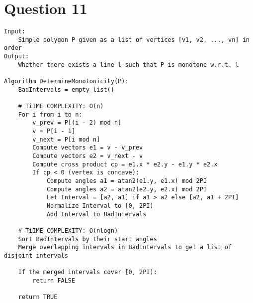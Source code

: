 \documentclass{article}
\begin{document}
\section*{Question 11}
\begin{verbatim}
Input: 
    Simple polygon P given as a list of vertices [v1, v2, ..., vn] in order
Output: 
    Whether there exists a line l such that P is monotone w.r.t. l

Algorithm DetermineMonotonicity(P):
    BadIntervals = empty_list()

    # TiIME COMPLEXITY: O(n)
    For i from i to n:
        v_prev = P[(i - 2) mod n]   
        v = P[i - 1]
        v_next = P[i mod n]
        Compute vectors e1 = v - v_prev
        Compute vectors e2 = v_next - v
        Compute cross product cp = e1.x * e2.y - e1.y * e2.x
        If cp < 0 (vertex is concave):
            Compute angles a1 = atan2(e1.y, e1.x) mod 2PI
            Compute angles a2 = atan2(e2.y, e2.x) mod 2PI
            Let Interval = [a2, a1] if a1 > a2 else [a2, a1 + 2PI]
            Normalize Interval to [0, 2PI)
            Add Interval to BadIntervals
        
    # TiIME COMPLEXITY: O(nlogn)
    Sort BadIntervals by their start angles
    Merge overlapping intervals in BadIntervals to get a list of disjoint intervals

    If the merged intervals cover [0, 2PI): 
        return FALSE

    return TRUE
        
\end{verbatim}

\newpage
\end{document}

